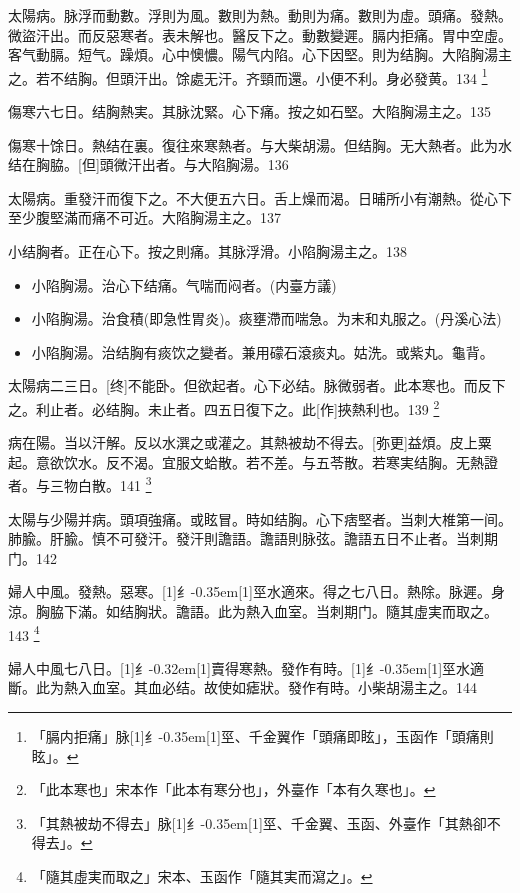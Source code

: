 \documentclass[oneside,b4paper]{ctexbook}
\begin{document}
\begin{flushleft}
太陽病。脉浮而動數。浮則为風。數則为熱。動則为痛。數則为虛。頭痛。發熱。微盜汗出。而反惡寒者。表未解也。醫反下之。動數變遲。膈内拒痛。胃中空虛。客气動膈。短气。躁煩。心中懊憹。陽气内陷。心下因堅。則为结胸。大陷胸湯主之。若不结胸。但頭汗出。馀處无汗。齐頸而還。小便不利。身必發黄。134
\footnote{「膈内拒痛」脉{\hbox{\scalebox{0.68}[1]{纟}\kern-0.35em\scalebox{0.64}[1]{巠}}}、千金翼作「頭痛即眩」，玉函作「頭痛則眩」。}

傷寒六七日。结胸熱実。其脉沈緊。心下痛。按之如石堅。大陷胸湯主之。135

傷寒十馀日。熱结在裏。復往來寒熱者。与大柴胡湯。但结胸。无大熱者。此为水结在胸脇。[但]頭微汗出者。与大陷胸湯。136

太陽病。重發汗而復下之。不大便五六日。舌上燥而渴。日晡所小有潮熱。從心下至少腹堅滿而痛不可近。大陷胸湯主之。137

小结胸者。正在心下。按之則痛。其脉浮滑。小陷胸湯主之。138

\begin{itemize}
\item 小陷胸湯。治心下结痛。气喘而闷者。(内臺方議)
\item 小陷胸湯。治食積(即急性胃炎)。痰壅滯而喘急。为末和丸服之。(丹溪心法)
\item 小陷胸湯。治结胸有痰饮之變者。兼用礞石滾痰丸。姑洗。或紫丸。龜背。
\end{itemize}

太陽病二三日。[终]不能卧。但欲起者。心下必结。脉微弱者。此本寒也。而反下之。利止者。必结胸。未止者。四五日復下之。此[作]挾熱利也。139
\footnote{「此本寒也」宋本作「此本有寒分也」，外臺作「本有久寒也」。}

病在陽。当以汗解。反以水潠之或灌之。其熱被劫不得去。[弥更]益煩。皮上粟起。意欲饮水。反不渴。宜服文蛤散。若不差。与五苓散。若寒実结胸。无熱證者。与三物白散。141
\footnote{「其熱被劫不得去」脉{\hbox{\scalebox{0.68}[1]{纟}\kern-0.35em\scalebox{0.64}[1]{巠}}}、千金翼、玉函、外臺作「其熱卻不得去」。}

太陽与少陽并病。頭項強痛。或眩冒。時如结胸。心下痞堅者。当刺大椎第一间。肺腧。肝腧。慎不可發汗。發汗則譫語。譫語則脉弦。譫語五日不止者。当刺期门。142

婦人中風。發熱。惡寒。{\hbox{\scalebox{0.68}[1]{纟}\kern-0.35em\scalebox{0.64}[1]{巠}}}水適來。得之七八日。熱除。脉遲。身涼。胸脇下滿。如结胸狀。譫語。此为熱入血室。当刺期门。隨其虛実而取之。143
\footnote{「隨其虛実而取之」宋本、玉函作「隨其実而瀉之」。}

婦人中風七八日。{\hbox{\scalebox{0.6}[1]{纟}\kern-0.32em\scalebox{0.7}[1]{賣}}}得寒熱。發作有時。{\hbox{\scalebox{0.68}[1]{纟}\kern-0.35em\scalebox{0.64}[1]{巠}}}水適斷。此为熱入血室。其血必结。故使如瘧狀。發作有時。小柴胡湯主之。144


\end{flushleft}
\end{document}
